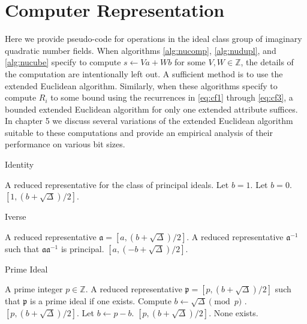 \documentclass{ucalgthes1}
\theoremstyle{plain}
\theoremstyle{definition}
\newcommand{\ZZ}{\mathbb{Z}}
\begin{document}
\bigbreak
\section{Computer Representation}
\label{section:computerRepresentation}

Here we provide pseudo-code for operations in the ideal class group of imaginary quadratic number fields.  When algorithms \ref{alg:nucomp}, \ref{alg:nudupl}, and \ref{alg:nucube} specify to compute $s \leftarrow Va + Wb$ for some $V,W \in \ZZ$, the details of the computation are intentionally left out.  A sufficient method is to use the extended Euclidean algorithm.  Similarly, when these algorithms specify to compute $R_i$ to some bound using the recurrences in \eqref{eq:cf1} through \eqref{eq:cf3}, a bounded extended Euclidean algorithm for only one extended attribute suffices. In chapter 5 we discuss several variations of the extended Euclidean algorithm suitable to these computations and provide an empirical analysis of their performance on various bit sizes.

\bigbreak
\bigbreak

\begin{algorithm}[h]
\caption{Identity}
\label{alg:identity}
\begin{algorithmic}[1]
\ENSURE A reduced representative for the class of principal ideals.
	\STATE Let $b = 1$.
\ELSE
	\STATE Let $b = 0$.
\ENDIF
\RETURN $[1, (b+\sqrt\Delta)/2]$.
\end{algorithmic}
\end{algorithm}


\begin{algorithm}[h]
\caption{Iverse}
\label{alg:inverse}
\begin{algorithmic}[1]
\REQUIRE A reduced representative $\mathfrak a = [a, (b+\sqrt\Delta)/2]$.
\ENSURE A reduced representative $\mathfrak a^{-1}$ such that $\mathfrak a \mathfrak a^{-1}$ is principal.
\RETURN $[a, (-b+\sqrt\Delta)/2]$.
\end{algorithmic}
\end{algorithm}


\begin{algorithm}[h]
\caption{Prime Ideal}
\label{alg:prime}
\begin{algorithmic}[1]
\REQUIRE A prime integer $p \in \ZZ$.
\ENSURE A reduced representative $\mathfrak p = [p, (b+\sqrt\Delta)/2]$ such that $\mathfrak p$ is a prime ideal if one exists.
\STATE Compute $b \leftarrow \sqrt\Delta \pmod p$ .
	\RETURN $[p, (b+\sqrt\Delta)/2]$.	
\ENDIF
\STATE Let $b \leftarrow p-b$.
	\RETURN $[p, (b+\sqrt\Delta)/2]$.	
\ENDIF
\RETURN None exists.
\end{algorithmic}
\end{algorithm}
\end{document}
